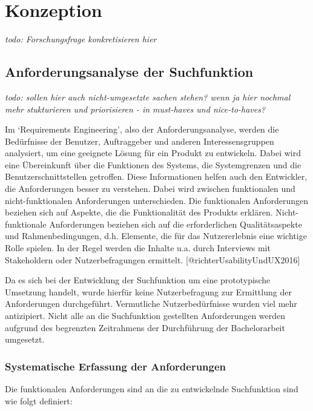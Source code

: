 \documentclass[
  12pt,
  a4paperpaper,
]{report}
\begin{document}
\chapter{Konzeption}\label{konzeption}

\emph{todo: Forschungsfrage konkretisieren hier}

\section{Anforderungsanalyse der
Suchfunktion}\label{anforderungsanalyse-der-suchfunktion}

\emph{todo: sollen hier auch nicht-umgesetzte sachen stehen? wenn ja
hier nochmal mehr stukturieren und priorisieren - in must-haves und
nice-to-haves?}

Im `Requirements Engineering', also der Anforderungsanalyse, werden die
Bedürfnisse der Benutzer, Auftraggeber und anderen Interessensgruppen
analysiert, um eine geeignete Lösung für ein Produkt zu entwickeln.
Dabei wird eine Übereinkunft über die Funktionen des Systems, die
Systemgrenzen und die Benutzerschnittstellen getroffen. Diese
Informationen helfen auch den Entwickler, die Anforderungen besser zu
verstehen. Dabei wird zwischen funktionalen und nicht-funktionalen
Anforderungen unterschieden. Die funktionalen Anforderungen beziehen
sich auf Aspekte, die die Funktionalität des Produkts erklären.
Nicht-funktionale Anforderungen beziehen sich auf die erforderlichen
Qualitätsaspekte und Rahmenbedingungen, d.h. Elemente, die für das
Nutzererlebnis eine wichtige Rolle spielen. In der Regel werden die
Inhalte u.a. durch Interviews mit Stakeholdern oder Nutzerbefragungen
ermittelt. {[}@richterUsabilityUndUX2016{]}

Da es sich bei der Entwicklung der Suchfunktion um eine prototypische
Umsetzung handelt, wurde hierfür keine Nutzerbefragung zur Ermittlung
der Anforderungen durchgeführt. Vermutliche Nutzerbedürfnisse wurden
viel mehr antizipiert. Nicht alle an die Suchfunktion gestellten
Anforderungen werden aufgrund des begrenzten Zeitrahmens der
Durchführung der Bachelorarbeit umgesetzt.

\subsection{Systematische Erfassung der
Anforderungen}\label{systematische-erfassung-der-anforderungen}

Die funktionalen Anforderungen sind an die zu entwickelnde Suchfunktion
sind wie folgt definiert:
\end{document}
